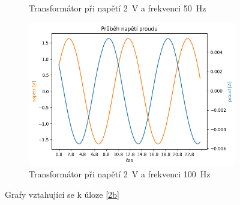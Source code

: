 \documentclass[a4paper]{article}
\begin{document}
\begin{figure}[h!]
\begin{subfigure}{0.49\textwidth}
		\caption{Transformátor při napětí \SI{2}{\volt} a frekvenci \SI{50}{\hertz}}
	\end{subfigure}
	\hfill
	\begin{subfigure}{0.49\textwidth}
		\includegraphics[width=\textwidth]{Trafo2b_2V_100Hz.png}
		\caption{Transformátor při napětí \SI{2}{\volt} a frekvenci \SI{100}{\hertz}}
	\end{subfigure}
	\caption{Grafy vztahující se k úloze \ref{2b}}
\end{figure}
\end{document}
